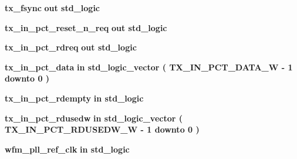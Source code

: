 \begin{DoxyCompactItemize}
\item 
{\bf tx\+\_\+fsync}  {\bfseries {\bfseries \textcolor{keywordflow}{out}\textcolor{vhdlchar}{ }}} {\bfseries \textcolor{comment}{std\+\_\+logic}\textcolor{vhdlchar}{ }} 
\item 
{\bf tx\+\_\+in\+\_\+pct\+\_\+reset\+\_\+n\+\_\+req}  {\bfseries {\bfseries \textcolor{keywordflow}{out}\textcolor{vhdlchar}{ }}} {\bfseries \textcolor{comment}{std\+\_\+logic}\textcolor{vhdlchar}{ }} 
\item 
{\bf tx\+\_\+in\+\_\+pct\+\_\+rdreq}  {\bfseries {\bfseries \textcolor{keywordflow}{out}\textcolor{vhdlchar}{ }}} {\bfseries \textcolor{comment}{std\+\_\+logic}\textcolor{vhdlchar}{ }} 
\item 
{\bf tx\+\_\+in\+\_\+pct\+\_\+data}  {\bfseries {\bfseries \textcolor{keywordflow}{in}\textcolor{vhdlchar}{ }}} {\bfseries \textcolor{comment}{std\+\_\+logic\+\_\+vector}\textcolor{vhdlchar}{ }\textcolor{vhdlchar}{(}\textcolor{vhdlchar}{ }\textcolor{vhdlchar}{ }\textcolor{vhdlchar}{ }\textcolor{vhdlchar}{ }{\bfseries {\bf T\+X\+\_\+\+I\+N\+\_\+\+P\+C\+T\+\_\+\+D\+A\+T\+A\+\_\+W}} \textcolor{vhdlchar}{-\/}\textcolor{vhdlchar}{ } \textcolor{vhdldigit}{1} \textcolor{vhdlchar}{ }\textcolor{keywordflow}{downto}\textcolor{vhdlchar}{ }\textcolor{vhdlchar}{ } \textcolor{vhdldigit}{0} \textcolor{vhdlchar}{ }\textcolor{vhdlchar}{)}\textcolor{vhdlchar}{ }} 
\item 
{\bf tx\+\_\+in\+\_\+pct\+\_\+rdempty}  {\bfseries {\bfseries \textcolor{keywordflow}{in}\textcolor{vhdlchar}{ }}} {\bfseries \textcolor{comment}{std\+\_\+logic}\textcolor{vhdlchar}{ }} 
\item 
{\bf tx\+\_\+in\+\_\+pct\+\_\+rdusedw}  {\bfseries {\bfseries \textcolor{keywordflow}{in}\textcolor{vhdlchar}{ }}} {\bfseries \textcolor{comment}{std\+\_\+logic\+\_\+vector}\textcolor{vhdlchar}{ }\textcolor{vhdlchar}{(}\textcolor{vhdlchar}{ }\textcolor{vhdlchar}{ }\textcolor{vhdlchar}{ }\textcolor{vhdlchar}{ }{\bfseries {\bf T\+X\+\_\+\+I\+N\+\_\+\+P\+C\+T\+\_\+\+R\+D\+U\+S\+E\+D\+W\+\_\+W}} \textcolor{vhdlchar}{-\/}\textcolor{vhdlchar}{ } \textcolor{vhdldigit}{1} \textcolor{vhdlchar}{ }\textcolor{keywordflow}{downto}\textcolor{vhdlchar}{ }\textcolor{vhdlchar}{ } \textcolor{vhdldigit}{0} \textcolor{vhdlchar}{ }\textcolor{vhdlchar}{)}\textcolor{vhdlchar}{ }} 
\item 
{\bf wfm\+\_\+pll\+\_\+ref\+\_\+clk}  {\bfseries {\bfseries \textcolor{keywordflow}{in}\textcolor{vhdlchar}{ }}} {\bfseries \textcolor{comment}{std\+\_\+logic}\textcolor{vhdlchar}{ }} 
\item 

\end{DoxyCompactItemize}
